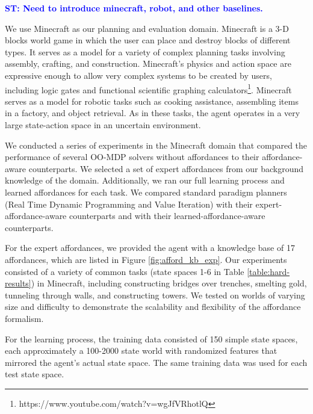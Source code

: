 \documentclass[conference]{IEEEtran}
\newcommand{\stnote}[1]{\textcolor{Blue}{\textbf{ST: #1}}}
\begin{document}
\stnote{Need to introduce minecraft, robot, and other baselines.}

We use Minecraft as our planning and evaluation domain. Minecraft is a
 3-D blocks world game in which the user can place and destroy blocks
 of different types. It serves as a model for a variety of complex planning tasks involving 
 assembly, crafting, and construction.  Minecraft's physics and action space are expressive
 enough to allow very complex systems to be created by users, including logic gates and 
 functional scientific graphing calculators\footnote{https://www.youtube.com/watch?v=wgJfVRhotlQ}.
 Minecraft serves as a model for robotic tasks such as cooking assistance, assembling items in a factory, 
 and object retrieval.  As in these tasks, the agent operates in a very large state-action space in an uncertain environment.

We conducted a series of experiments in the Minecraft domain that
compared the performance of several OO-MDP solvers without affordances
to their affordance-aware counterparts. We selected a set of expert
affordances from our background knowledge of the domain. Additionally, we ran our full
learning process and learned affordances for each
task. We compared standard paradigm planners (Real Time Dynamic
Programming and Value Iteration) with their expert-affordance-aware
counterparts and with their learned-affordance-aware counterparts.

For the expert affordances, we provided the agent with a knowledge base of 17 affordances,
which are listed in Figure \ref{fig:afford_kb_exp}.  Our experiments
consisted of a variety of common tasks (state spaces 1-6 in Table \ref{table:hard-results}) in Minecraft, including
constructing bridges over trenches, smelting gold, tunneling
through walls, and constructing towers.  We tested on worlds of varying size
and difficulty to demonstrate the scalability and flexibility of the
affordance formalism.

For the learning process, the training data consisted of 150 simple state
spaces, each approximately a 100-2000 state world with randomized features that mirrored the agent's actual state space. The same training data was used
for each test state space.
\end{document}
